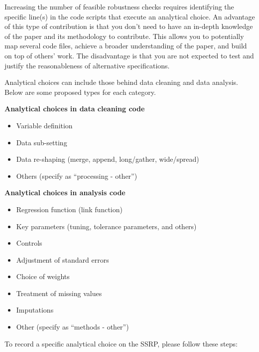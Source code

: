 \documentclass[
]{book}
\providecommand{\tightlist}{%
  \setlength{\itemsep}{0pt}\setlength{\parskip}{0pt}}
\begin{document}
Increasing the number of feasible robustness checks requires identifying the specific line(s) in the code scripts that execute an analytical choice. An advantage of this type of contribution is that you don't need to have an in-depth knowledge of the paper and its methodology to contribute. This allows you to potentially map several code files, achieve a broader understanding of the paper, and build on top of others' work. The disadvantage is that you are not expected to test and justify the reasonableness of alternative specifications.

Analytical choices can include those behind data cleaning and data analysis. Below are some proposed types for each category.

\textbf{Analytical choices in data cleaning code}

\begin{itemize}
\tightlist
\item
  Variable definition
\item
  Data sub-setting
\item
  Data re-shaping (merge, append, long/gather, wide/spread)
\item
  Others (specify as ``processing - other'')
\end{itemize}

\textbf{Analytical choices in analysis code}

\begin{itemize}
\tightlist
\item
  Regression function (link function)
\item
  Key parameters (tuning, tolerance parameters, and others)
\item
  Controls
\item
  Adjustment of standard errors
\item
  Choice of weights
\item
  Treatment of missing values
\item
  Imputations
\item
  Other (specify as ``methods - other'')
\end{itemize}

To record a specific analytical choice on the SSRP, please follow these steps:
\end{document}
